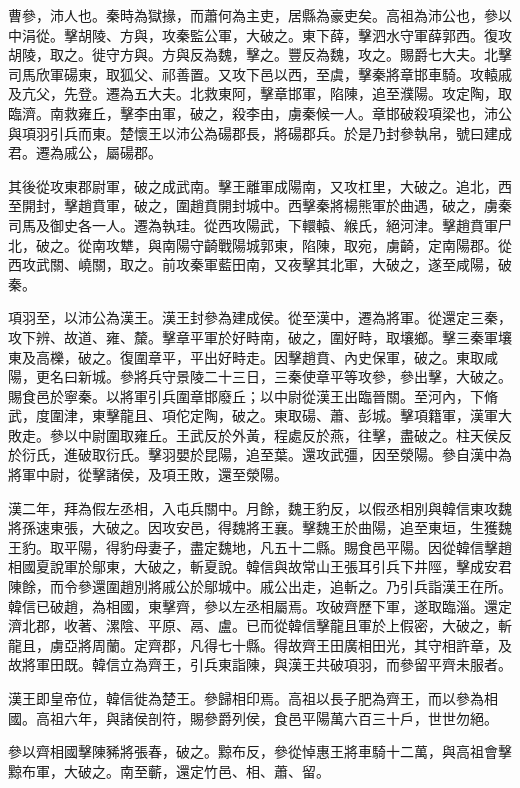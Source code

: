 \begin{pinyinscope}
曹參，沛人也。秦時為獄掾，而蕭何為主吏，居縣為豪吏矣。高祖為沛公也，參以中涓從。擊胡陵、方與，攻秦監公軍，大破之。東下薛，擊泗水守軍薛郭西。復攻胡陵，取之。徙守方與。方與反為魏，擊之。豐反為魏，攻之。賜爵七大夫。北擊司馬欣軍碭東，取狐父、祁善置。又攻下邑以西，至虞，擊秦將章邯車騎。攻轅戚及亢父，先登。遷為五大夫。北救東阿，擊章邯軍，陷陳，追至濮陽。攻定陶，取臨濟。南救雍丘，擊李由軍，破之，殺李由，虜秦候一人。章邯破殺項梁也，沛公與項羽引兵而東。楚懷王以沛公為碭郡長，將碭郡兵。於是乃封參執帛，號曰建成君。遷為戚公，屬碭郡。

其後從攻東郡尉軍，破之成武南。擊王離軍成陽南，又攻杠里，大破之。追北，西至開封，擊趙賁軍，破之，圍趙賁開封城中。西擊秦將楊熊軍於曲遇，破之，虜秦司馬及御史各一人。遷為執珪。從西攻陽武，下轘轅、緱氏，絕河津。擊趙賁軍尸北，破之。從南攻犨，與南陽守齮戰陽城郭東，陷陳，取宛，虜齮，定南陽郡。從西攻武關、嶢關，取之。前攻秦軍藍田南，又夜擊其北軍，大破之，遂至咸陽，破秦。

項羽至，以沛公為漢王。漢王封參為建成侯。從至漢中，遷為將軍。從還定三秦，攻下辨、故道、雍、斄。擊章平軍於好畤南，破之，圍好畤，取壤鄉。擊三秦軍壤東及高櫟，破之。復圍章平，平出好畤走。因擊趙賁、內史保軍，破之。東取咸陽，更名曰新城。參將兵守景陵二十三日，三秦使章平等攻參，參出擊，大破之。賜食邑於寧秦。以將軍引兵圍章邯廢丘；以中尉從漢王出臨晉關。至河內，下脩武，度圍津，東擊龍且、項佗定陶，破之。東取碭、蕭、彭城。擊項籍軍，漢軍大敗走。參以中尉圍取雍丘。王武反於外黃，程處反於燕，往擊，盡破之。柱天侯反於衍氏，進破取衍氏。擊羽嬰於昆陽，追至葉。還攻武彊，因至滎陽。參自漢中為將軍中尉，從擊諸侯，及項王敗，還至滎陽。

漢二年，拜為假左丞相，入屯兵關中。月餘，魏王豹反，以假丞相別與韓信東攻魏將孫速東張，大破之。因攻安邑，得魏將王襄。擊魏王於曲陽，追至東垣，生獲魏王豹。取平陽，得豹母妻子，盡定魏地，凡五十二縣。賜食邑平陽。因從韓信擊趙相國夏說軍於鄔東，大破之，斬夏說。韓信與故常山王張耳引兵下井陘，擊成安君陳餘，而令參還圍趙別將戚公於鄔城中。戚公出走，追斬之。乃引兵詣漢王在所。韓信已破趙，為相國，東擊齊，參以左丞相屬焉。攻破齊歷下軍，遂取臨淄。還定濟北郡，收著、漯陰、平原、鬲、盧。已而從韓信擊龍且軍於上假密，大破之，斬龍且，虜亞將周蘭。定齊郡，凡得七十縣。得故齊王田廣相田光，其守相許章，及故將軍田既。韓信立為齊王，引兵東詣陳，與漢王共破項羽，而參留平齊未服者。

漢王即皇帝位，韓信徙為楚王。參歸相印焉。高祖以長子肥為齊王，而以參為相國。高祖六年，與諸侯剖符，賜參爵列侯，食邑平陽萬六百三十戶，世世勿絕。

參以齊相國擊陳豨將張春，破之。黥布反，參從悼惠王將車騎十二萬，與高祖會擊黥布軍，大破之。南至蘄，還定竹邑、相、蕭、留。


\end{pinyinscope}
